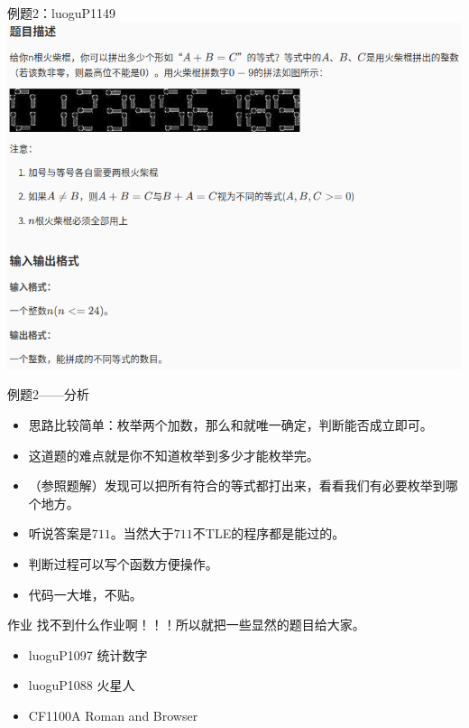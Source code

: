 \documentclass{beamer}[UTF-8]
\begin{document}
\begin{frame}{例题2：luoguP1149}
\includegraphics[width=\textwidth, height=\textheight]{luoguP1149.png}
\end{frame}

\begin{frame}{例题2——分析}
 \pause
\begin{itemize}
\item 思路比较简单：枚举两个加数，那么和就唯一确定，判断能否成立即可。 \pause
\item 这道题的难点就是你不知道枚举到多少才能枚举完。 \pause
\item （参照题解）发现可以把所有符合的等式都打出来，看看我们有必要枚举到哪个地方。  \pause
\item 听说答案是$711$。当然大于$711$不TLE的程序都是能过的。 \pause
\item 判断过程可以写个函数方便操作。 \pause
\item 代码一大堆，不贴。
\end{itemize}
\end{frame}

\begin{frame}{作业}
 \pause
找不到什么作业啊！！！所以就把一些显然的题目给大家。 \pause
\begin{itemize}
\item luoguP1097 统计数字 \pause
\item luoguP1088 火星人 \pause
\item CF1100A Roman and Browser \pause
\end{itemize}
\end{frame}
\end{document}

